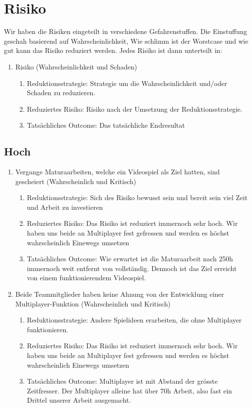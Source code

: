 \chapter{Risiko}
Wir haben die Risiken eingeteilt in verschiedene Gefahrenstuffen.
Die Einstuffung geschah basierend auf Wahrscheinlichkeit, Wie schlimm ist der Worstcase und wie gut kann das Risiko reduziert werden.
Jedes Risiko ist dann unterteilt in:
\begin{enumerate}
    \item Risiko (Wahrscheinlichkeit und Schaden)
    \begin{enumerate}
        \item Reduktionsstrategie: Strategie um die Wahrscheinlichkeit und/oder Schaden zu reduzieren.
        \item Reduziertes Risiko: Risiko nach der Umsetzung der Reduktionsstrategie.
        \item Tatsächliches Outcome: Das tatsächliche Endresultat
    \end{enumerate}
\end{enumerate}

\section{Hoch}
\begin{enumerate}
    \item Vergange Maturaarbeiten, welche ein Videospiel als Ziel hatten, sind gescheiert (Wahrscheinlich und Kritisch)
    \begin{enumerate}
        \item Reduktionsstrategie: Sich des Risiko bewusst sein und bereit sein viel Zeit und Arbeit zu investieren
        \item Reduziertes Risiko: Das Risiko ist reduziert immernoch sehr hoch.
            Wir haben uns beide an Multiplayer fest gefressen und werden es höchst wahrscheinlich Einewegs umsetzen
        \item Tatsächliches Outcome: Wie erwartet ist die Maturaarbeit nach 250h immernoch weit entfernt von vollständig.
            Dennoch ist das Ziel erreicht von einem funktionierendem Videospiel.
    \end{enumerate}

    \item Beide Teammitglieder haben keine Ahnung von der Entwicklung einer Multiplayer-Funktion (Wahrscheinlich und Kritisch)
    \begin{enumerate}
        \item Reduktionsstrategie: Andere Spielideen erarbeiten, die ohne Multiplayer funktionieren.
        \item Reduziertes Risiko: Das Risiko ist reduziert immernoch sehr hoch.
              Wir haben uns beide an Multiplayer fest gefressen und werden es höchst wahrscheinlich Einewegs umsetzen
        \item Tatsächliches Outcome: Multiplayer ist mit Abstand der grösste Zeitfresser.
              Der Multiplayer alleine hat über 70h Arbeit, also fast ein Drittel unserer Arbeit ausgemacht.
    \end{enumerate}
\end{enumerate}

